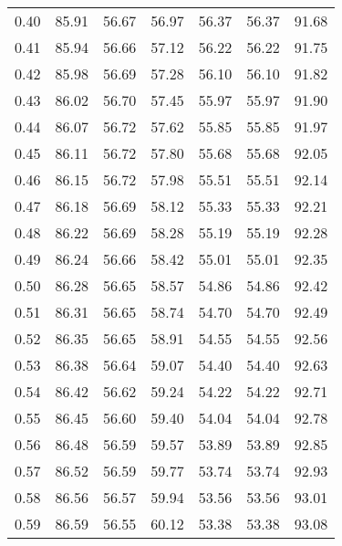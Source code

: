 \begin{tabular}{|c|c|c|c|c|c|c|}
      0.40 &     85.91 &     56.67 &      56.97 &   56.37 &      56.37 &         91.68 \\
      0.41 &     85.94 &     56.66 &      57.12 &   56.22 &      56.22 &         91.75 \\
      0.42 &     85.98 &     56.69 &      57.28 &   56.10 &      56.10 &         91.82 \\
      0.43 &     86.02 &     56.70 &      57.45 &   55.97 &      55.97 &         91.90 \\
      0.44 &     86.07 &     56.72 &      57.62 &   55.85 &      55.85 &         91.97 \\
      0.45 &     86.11 &     56.72 &      57.80 &   55.68 &      55.68 &         92.05 \\
      0.46 &     86.15 &     56.72 &      57.98 &   55.51 &      55.51 &         92.14 \\
      0.47 &     86.18 &     56.69 &      58.12 &   55.33 &      55.33 &         92.21 \\
      0.48 &     86.22 &     56.69 &      58.28 &   55.19 &      55.19 &         92.28 \\
      0.49 &     86.24 &     56.66 &      58.42 &   55.01 &      55.01 &         92.35 \\
      0.50 &     86.28 &     56.65 &      58.57 &   54.86 &      54.86 &         92.42 \\
      0.51 &     86.31 &     56.65 &      58.74 &   54.70 &      54.70 &         92.49 \\
      0.52 &     86.35 &     56.65 &      58.91 &   54.55 &      54.55 &         92.56 \\
      0.53 &     86.38 &     56.64 &      59.07 &   54.40 &      54.40 &         92.63 \\
      0.54 &     86.42 &     56.62 &      59.24 &   54.22 &      54.22 &         92.71 \\
      0.55 &     86.45 &     56.60 &      59.40 &   54.04 &      54.04 &         92.78 \\
      0.56 &     86.48 &     56.59 &      59.57 &   53.89 &      53.89 &         92.85 \\
      0.57 &     86.52 &     56.59 &      59.77 &   53.74 &      53.74 &         92.93 \\
      0.58 &     86.56 &     56.57 &      59.94 &   53.56 &      53.56 &         93.01 \\
      0.59 &     86.59 &     56.55 &      60.12 &   53.38 &      53.38 &         93.08 \\

\end{tabular}
